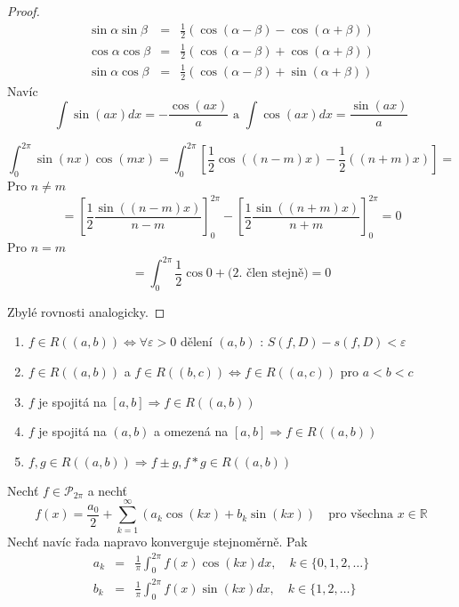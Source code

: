 \begin{proof}

\begin{eqnarray*}
\sin \alpha \sin \beta & = & \frac{1}{2} \left( \cos (\alpha - \beta) - \cos (\alpha + \beta) \right) \\
\cos \alpha \cos \beta & = & \frac{1}{2} \left( \cos (\alpha - \beta) + \cos (\alpha + \beta) \right) \\
\sin \alpha \cos \beta & = & \frac{1}{2} \left( \cos (\alpha - \beta) + \sin (\alpha + \beta) \right) 
\end{eqnarray*}
Navíc
$$\int \sin(ax) dx = -\frac{\cos (ax)}{a} \textrm { a } \int \cos (ax) dx = \frac{\sin (ax)}{a}$$

$$\int_{0}^{2 \pi} \sin (nx) \cos(mx) = \int_{0}^{2 \pi} \left[ \frac{1}{2} \cos \left( (n-m)x \right) - \frac{1}{2} \left( (n+m)x \right) \right] = $$
Pro $n \neq m$
$$= \left[ \frac{1}{2} \frac{\sin \left( (n-m)x \right)}{n-m} \right]_{0}^{2 \pi} - \left[ \frac{1}{2} \frac{\sin \left( (n+m)x \right)}{n+m} \right]_{0}^{2 \pi} = 0$$
Pro $n=m$
$$=\int_{0}^{2 \pi} \frac{1}{2} \cos 0 + \textrm{(2. člen stejně)} = 0$$

Zbylé rovnosti analogicky.
\end{proof}\begin{opakovani} \quad
\begin{enumerate}
\item $f \in R((a,b)) \Leftrightarrow \forall \varepsilon > 0 \textrm{ dělení } (a,b)$ : $S(f,D) -s(f,D) < \varepsilon$
\item $f \in R((a,b))$ a $f \in R((b,c)) \Leftrightarrow f \in R((a,c))$ pro $a<b<c$
\item $f$ je spojitá na $[a,b] \Rightarrow f \in R((a,b))$
\item $f$ je spojitá na $(a,b)$ a omezená na $[a,b] \Rightarrow f \in R((a,b))$
\item $f, g \in R((a,b)) \Rightarrow f \pm g, f * g \in R((a,b))$
\end{enumerate}
\end{opakovani}

\begin{vetal}
Nechť $f \in \mathcal{P}_{2 \pi}$ a nechť 
$$f(x) = \frac{a_0}{2} + \sum_{k=1}^{\infty} ( a_k \cos(kx) + b_k \sin(kx)) \quad \textrm{pro všechna $x \in \mathbb{R}$}$$
Nechť navíc řada napravo konverguje stejnoměrně. Pak
\begin{eqnarray*}
a_k & = & \frac{1}{\pi} \int_0^{2 \pi} f(x) \cos(kx) dx, \quad k \in \{0, 1, 2, \ldots\} \\
b_k & = & \frac{1}{\pi} \int_0^{2 \pi} f(x) \sin(kx) dx, \quad k \in \{1, 2, \ldots\} 
\end{eqnarray*}
\end{vetal}


